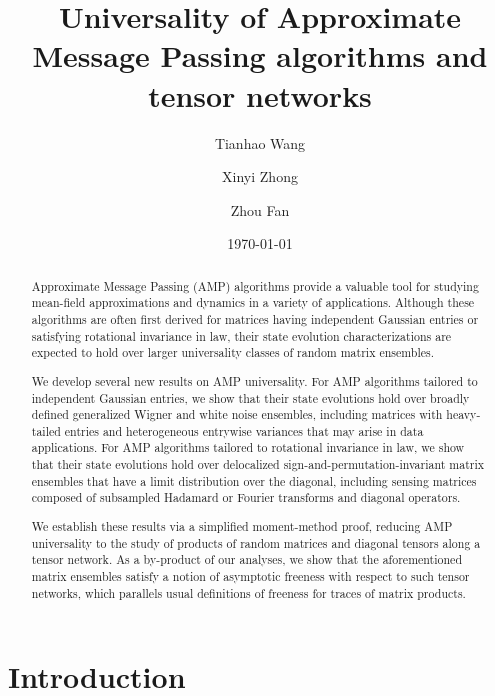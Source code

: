 \documentclass[10pt,reqno]{amsart}
\title{Universality of Approximate Message Passing algorithms and
tensor networks}
\author{Tianhao Wang}\email{tianhao.wang@yale.edu}
\author{Xinyi Zhong}\email{xinyi.zhong@yale.edu}
\author{Zhou Fan}\email{zhou.fan@yale.edu}
\date{\today}
\begin{document}
\begin{abstract}
Approximate Message Passing (AMP) algorithms provide a valuable tool for
studying mean-field approximations and dynamics in a variety of applications.
Although these algorithms are often first derived for matrices having
independent Gaussian entries or satisfying rotational invariance in law, their
state evolution characterizations are expected to hold over larger universality
classes of random matrix ensembles.

We develop several new results on AMP universality. For AMP algorithms tailored
to independent Gaussian entries, we show that their state evolutions hold over
broadly defined generalized Wigner and white noise ensembles, including matrices
with heavy-tailed entries and heterogeneous entrywise variances that may arise
in data applications. For AMP algorithms tailored to rotational invariance in
law, we show that their state evolutions hold over
delocalized sign-and-permutation-invariant
matrix ensembles that have a limit distribution over the diagonal,
including sensing matrices composed of subsampled Hadamard or Fourier transforms
and diagonal operators.

We establish these results via a simplified moment-method proof, reducing AMP
universality to the study of products of random matrices and diagonal tensors
along a tensor network. As a by-product of our analyses, we show that the
aforementioned matrix ensembles satisfy a notion of asymptotic freeness with
respect to such tensor networks, which parallels usual definitions of freeness
for traces of matrix products.
\end{abstract}

\maketitle

\section{Introduction}\label{sec:intro}
\end{document}

